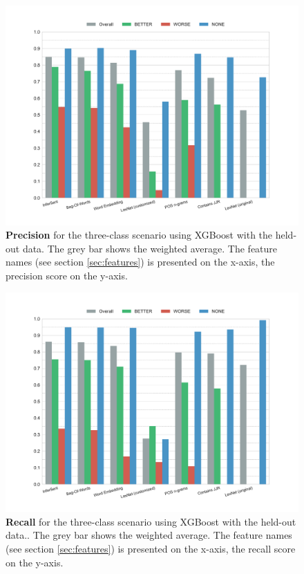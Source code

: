 \begin{figure}[htbp]
         \caption{\textbf{Precision} for the three-class scenario using XGBoost with the held-out data. The grey bar shows the weighted average. The feature names (see section \ref{sec:features}) is presented on the x-axis, the precision score on the y-axis.} 
    \label{fig:h_3_prec}
    \centering
	\includegraphics[width=0.9\linewidth]{images/heldout/h-precision-False}
    \end{figure}
    
    \begin{figure}[htbp]
              \caption{\textbf{Recall} for the three-class scenario using XGBoost with the held-out data.. The grey bar shows the weighted average. The feature names (see section \ref{sec:features}) is presented on the x-axis, the recall score on the y-axis.} 
       \label{fig:h_3_rec}
 \centering
	\includegraphics[width=0.9\linewidth]{images/heldout/h-recall-False}

\end{figure}

